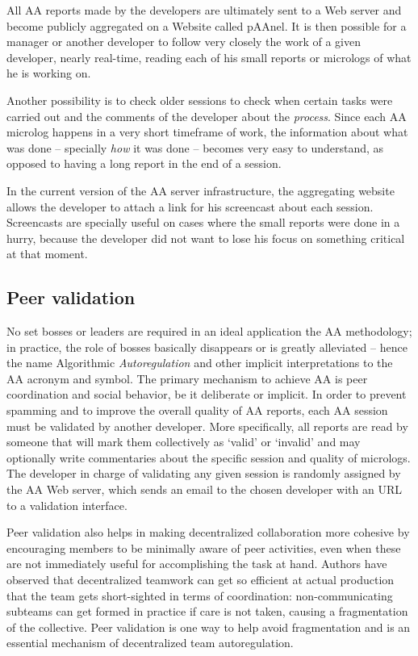 \documentclass{article}
\begin{document}
All AA reports made by the developers are ultimately sent to a Web server and
become publicly aggregated on a Website called pAAnel. It is then possible for a manager or another
developer to follow very closely the work of a given developer, nearly real-time,
reading each of his small reports or micrologs of what he is working on.

Another possibility is to check older sessions to check when certain tasks
were carried out and the comments of the developer about the \emph{process}.
Since each AA microlog happens in a very short timeframe of work, the information
about what was done -- specially \emph{how} it was done -- becomes very easy to
understand, as opposed to having a long report in the end of a session.

In the current version of the AA server infrastructure, the aggregating
website allows the developer to attach a link for his
screencast about each session. Screencasts are specially useful on cases where
the small reports were done in a hurry, because the developer did not want to
lose his focus on something critical at that moment.

\subsection{Peer validation}

No set bosses or leaders are required in an ideal application the AA methodology;
in practice, the role of bosses basically disappears or is greatly alleviated --
hence the name Algorithmic \emph{Autoregulation} and other implicit
interpretations to the AA acronym and symbol. The primary mechanism to achieve
AA is peer coordination and social behavior, be it deliberate or implicit. In
order to prevent spamming and to improve the overall quality of AA reports, each
AA session must be validated by another developer. More specifically, all
reports are read by someone that will mark them collectively as `valid' or
`invalid' and may optionally write commentaries about the specific session and
quality of micrologs. The developer in charge of validating any given session is
randomly assigned by the AA Web server, which sends an email to the chosen
developer with an URL to a validation interface. 

Peer validation also helps in making decentralized collaboration more cohesive
by encouraging members to be minimally aware of peer activities, even when these
are not immediately useful for accomplishing the task at hand.  Authors have observed
that decentralized teamwork can get so efficient at actual production that 
the team gets short-sighted in terms of coordination: non-communicating
subteams can get formed in practice if care is not taken, causing a
fragmentation of the collective. Peer validation is one way to help avoid
fragmentation and is an essential mechanism of decentralized team autoregulation.
\end{document}
